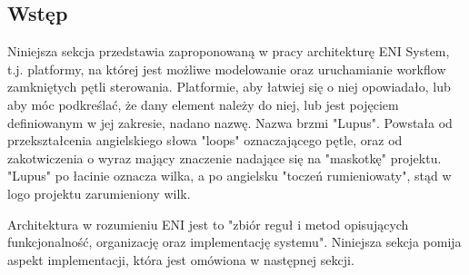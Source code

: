 \subsection{Wstęp}

Niniejsza sekcja przedstawia zaproponowaną w pracy architekturę ENI System, t.j. platformy, na której jest możliwe modelowanie oraz uruchamianie workflow zamkniętych pętli sterowania. Platformie, aby łatwiej się o niej opowiadało, lub aby móc podkreślać, że dany element należy do niej, lub jest pojęciem definiowanym w jej zakresie, nadano nazwę. Nazwa brzmi "Lupus". Powstała od przekształcenia angielskiego słowa "loops" oznaczającego pętle, oraz od zakotwiczenia o wyraz mający znaczenie nadające się na "maskotkę" projektu. "Lupus" po łacinie oznacza wilka, a po angielsku "toczeń rumieniowaty", stąd w logo projektu zarumieniony wilk. 

Architektura w rozumieniu ENI jest to "zbiór reguł i metod opisujących funkcjonalność, organizację oraz implementację systemu". Niniejsza sekcja pomija aspekt implementacji, która jest omówiona w następnej sekcji. 

